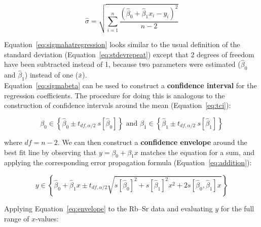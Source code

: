 \begin{equation}
  \hat{\sigma} = \sqrt{\sum\limits_{i=1}^{n}
    \frac{(\hat{\beta}_0+\hat{\beta}_1x_i-y_i)^2}{n-2}}
  \label{eq:sigmahatregression}
\end{equation}

Equation~\ref{eq:sigmahatregression} looks similar to the usual
definition of the standard deviation (Equation~\ref{eq:stdevrepeat})
except that 2 degrees of freedom have been subtracted instead of 1,
because two parameters were estimated ($\hat{\beta}_0$ and
$\hat{\beta}_1$) instead of one ($\bar{x}$).\\

Equation~\ref{eq:sigmabeta} can be used to construct a
\textbf{confidence interval} for the regression coefficients. The
procedure for doing this is analogous to the construction of
confidence intervals around the mean (Equation~\ref{eq:tci}):

\begin{equation}
  \beta_0 \in \left\{\hat{\beta}_0 \pm t_{df,\alpha/2}~s[\hat{\beta}_0]\right\}
  \mbox{~and~}
  \beta_1 \in \left\{\hat{\beta}_1 \pm t_{df,\alpha/2}~s[\hat{\beta}_1]\right\}
  \label{eq:ciregression}
\end{equation}

\noindent where $df=n-2$. We can then construct a \textbf{confidence
  envelope} around the best fit line by observing that
$y=\beta_0+\beta_1x$ matches the equation for a sum, and applying the
corresponding error propagation formula (Equation~\ref{eq:addition}):

\begin{equation}
  y \in \left\{\hat{\beta}_0 + \hat{\beta}_1 x \pm t_{df,\alpha/2}
  \sqrt{s[\hat{\beta}_0]^2 + s[\hat{\beta}_1]^2 x^2 +
    2 s[\hat{\beta}_0,\hat{\beta}_1]x} \right\}
  \label{eq:envelope}
\end{equation}

Applying Equation~\ref{eq:envelope} to the Rb--Sr data and evaluating
$y$ for the full range of $x$-values:

